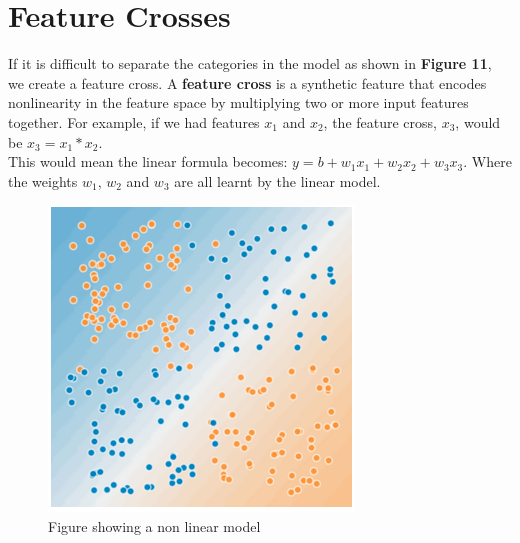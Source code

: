 \documentclass[12pt]{article}
\begin{document}
\section{Feature Crosses}
If it is difficult to separate the categories in the model as shown in \textbf{Figure 11}, we create a feature cross. A \textbf{feature cross} is a synthetic feature that encodes nonlinearity in the feature space by multiplying two or more input features together. For example, if we had features $x_1$ and $x_2$, the feature cross, $x_3$, would be $x_3 = x_1 * x_2$.
\\This would mean the linear formula becomes: $y = b + w_1x_1 + w_2x_2 + w_3x_3$. Where the weights $w_1$, $w_2$ and $w_3$ are all learnt by the linear model.

\begin{figure}[H]
	\includegraphics[scale = 0.5]{imgs/NonLinearModel.png}
	\centering
	\caption{Figure showing a non linear model }
\end{figure}
\end{document}
